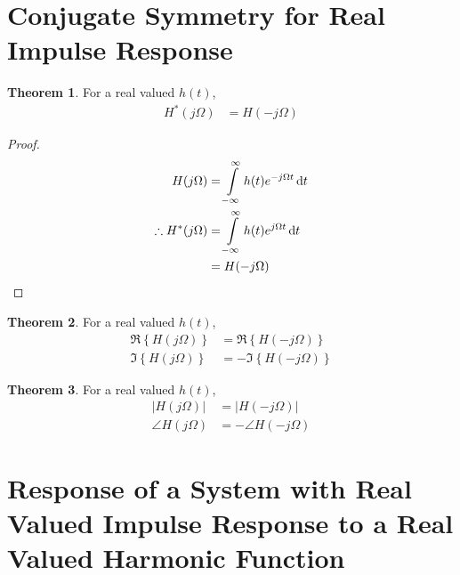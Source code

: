 \documentclass[titlepage, fleqn, a4paper, 12pt, twoside]{article}
\theoremstyle{definition}
\theoremstyle{theorem}
\newtheorem{theorem}{Theorem}
\begin{document}
\section{Conjugate Symmetry for Real Impulse Response}

\begin{theorem}
	For a real valued $h(t)$,
	\begin{align*}
		H^*(j \Omega) &= H(-j \Omega)
	\end{align*}
\end{theorem}

\begin{proof}
	\begin{align*}
		H(j \Omega) &= \int\limits_{-\infty}^{\infty} h(t) e^{-j \Omega t} \dif t\\
		\therefore H^*(j \Omega) &= \int\limits_{-\infty}^{\infty} h(t) e^{j \Omega t} \dif t\\
		&= H(-j \Omega)
	\end{align*}
\end{proof}

\begin{theorem}
	For a real valued $h(t)$,
	\begin{align*}
		\Re\left\{ H(j \Omega) \right\} &= \Re\left\{ H(-j \Omega) \right\}\\
		\Im\left\{ H(j \Omega) \right\} &= -\Im\left\{ H(-j \Omega) \right\}
	\end{align*}
\end{theorem}

\begin{theorem}
	For a real valued $h(t)$,
	\begin{align*}
		\left| H(j \Omega) \right| &= \left| H(-j \Omega) \right|\\
		\angle H(j \Omega) &= -\angle H(-j \Omega)
	\end{align*}
\end{theorem}

\section{Response of a System with Real Valued Impulse Response to a Real Valued Harmonic Function}
\end{document}
